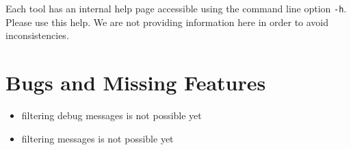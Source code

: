 \documentclass[a4paper,10pt]{article}
\begin{document}
Each tool has an internal help page accessible using the
command line option \texttt{-h}. Please use this help. We are not
providing information here in order to avoid inconsistencies.

\section{Bugs and Missing Features}%
\begin{itemize}
  \item filtering debug messages is not possible yet
  \item filtering messages is not possible yet
\end{itemize}
\end{document}
